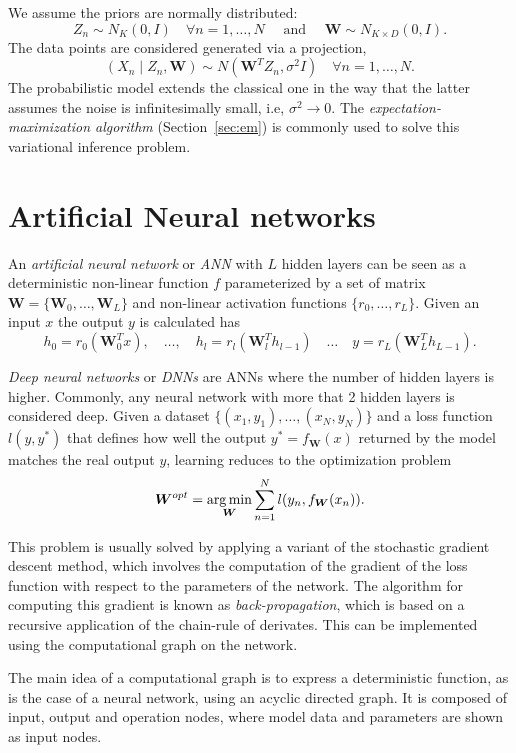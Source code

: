 We assume the priors are normally distributed:
\[
  Z_{n} \sim N_{K}(0, I) \quad \forall n =1,\dots,N \quad \text{ and } \quad \bm{W} \sim N_{K\times D}(0, I).
\]
The data points are considered generated via a projection,
\[
  (X_{n} \mid Z_{n}, \bm{W}) \sim N(\bm{W}^{T}Z_{n}, \sigma^{2}I)\quad \forall n = 1,\dots, N.
\]
The probabilistic model extends the classical one in the way that the latter assumes the noise is infinitesimally small, i.e, \(\sigma^{2} \to 0\). The \emph{expectation-maximization algorithm} (Section~\ref{sec:em}) is commonly used to solve this variational inference problem.



\section{Artificial Neural networks}

An \emph{artificial neural network} or \emph{ANN} with \(L\) hidden layers can be seen as a deterministic non-linear function \(f\) parameterized by a set of matrix \(\bm{W} = \{\bm{W}_{0},\dots, \bm{W}_{L}\}\) and non-linear activation functions \(\{r_{0},\dots, r_{L}\}\). Given an input \(x\) the output \(y\) is calculated has
\[
  h_{0} = r_{0}(\bm{W}^{T}_{0}x), \quad \dots, \quad h_{l} = r_{l}(\bm{W}_{l}^{T}h_{l-1}) \quad \dots \quad y = r_{L}(\bm{W}_{L}^{T}h_{L-1}).
\]

\emph{Deep neural networks} or \emph{DNNs} are ANNs where the number of hidden layers is higher. Commonly, any neural network with more that 2 hidden layers is considered deep. Given a dataset \(\{(x_{1}, y_{1}), \dots, (x_{N}, y_{N})\}\) and a loss function \(l(y,y^{*})\) that defines how well the output \(y^{*} = f_{\bm{W}}(x)\)  returned by the model matches the real output \(y\), learning reduces to the optimization problem
\[
  \bm{W}^{opt} = \operatorname*{arg\,min}_{\bm{W}} \sum_{n=1}^{N}l(y_{n}, f_{\bm{W}}(x_{n})).
\]

This problem is usually solved by applying a variant of the stochastic gradient descent method, which involves the computation of the gradient of the loss function with respect to the parameters of the network. The algorithm for computing this gradient is known as \emph{back-propagation}, which is based on a recursive application of the chain-rule of derivates. This can be implemented using the computational graph on the network.

The main idea of a computational graph is to express a deterministic function, as is the case of a neural network, using an acyclic directed graph. It is composed of input, output and operation nodes, where model data and parameters are shown as input nodes.

